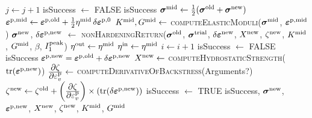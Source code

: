 \begin{breakablealgorithm}
\begin{algorithmic}[1]
          \State $j \leftarrow j+1$
             \State isSuccess $\leftarrow$ FALSE
             \State \Return isSuccess 
          \EndIf
        \EndWhile
        \State $\boldsymbol{\sigma}^{\text{mid}} \leftarrow \tfrac{1}{2}(\boldsymbol{\sigma}^{\text{old}} + \boldsymbol{\sigma}^{\text{new}})$
        \State $\boldsymbol{\varepsilon}^{\text{p},\text{mid}} \leftarrow \boldsymbol{\varepsilon}^{\text{p},\text{old}} + \tfrac{1}{2} \eta^{\text{mid}} \,\delta\boldsymbol{\varepsilon}^{\text{p},0}$
        \State $K^{\text{mid}}, G^{\text{mid}} \leftarrow$ 
           \textsc{computeElasticModuli}($\boldsymbol{\sigma}^{\text{mid}}$, $\boldsymbol{\varepsilon}^{\text{p},\text{mid}}$)
        \State $\boldsymbol{\sigma}^{\text{new}}$, $\delta\boldsymbol{\varepsilon}^{\text{p},\text{new}}$ $\leftarrow$
          \textsc{nonHardeningReturn}($\boldsymbol{\sigma}^{\text{old}}$, $\boldsymbol{\sigma}^{\text{trial}}$, $\delta\boldsymbol{\varepsilon}^{\text{new}}$,
                                     $X^{\text{new}}$, $\zeta^{\text{new}}$, $K^{\text{mid}}$, $G^{\text{mid}}$, $\beta$, $I_1^{\text{peak}}$)
          \State $\eta^{\text{out}} \leftarrow \eta^{\text{mid}}$ 
        \Else
            \State $\eta^{\text{in}} \leftarrow \eta^{\text{mid}}$ 
          \EndIf
        \EndIf
        \State $i \leftarrow i+1$
          \State isSuccess $\leftarrow$ FALSE
          \State \Return isSuccess 
        \EndIf
      \State $\boldsymbol{\varepsilon}^{\text{p},\text{new}} = \boldsymbol{\varepsilon}^{\text{p},\text{old}} + \delta\boldsymbol{\varepsilon}^{\text{p},\text{new}}$
      \State $X^{\text{new}} \leftarrow$ \textsc{computeHydrostaticStrength}($\text{tr}(\boldsymbol{\varepsilon}^{\text{p},\text{new}})$)
      \State $\frac{\displaystyle\partial \zeta}{\displaystyle\partial \varepsilon^{\text{p}}_v} \leftarrow $
        \textsc{computeDerivativeOfBackstress}({\Red Arguments?})
      \State $\zeta^{\text{new}} \leftarrow \zeta^{\text{old}} + 
        \left(\frac{\displaystyle\partial \zeta}{\displaystyle\partial \varepsilon^{\text{p}}_v}\right)\times(\text{tr}(\delta\boldsymbol{\varepsilon}^{\text{p},\text{new}}))$
      \State isSuccess $\leftarrow$ TRUE
      \State \Return isSuccess, $\boldsymbol{\sigma}^{\text{new}}$,
                     $\boldsymbol{\varepsilon}^{\text{p},\text{new}}$, $X^{\text{new}}$, $\zeta^{\text{new}}$, $K^{\text{mid}}$, $G^{\text{mid}}$
    \EndProcedure
  \end{algorithmic}
\end{breakablealgorithm}



